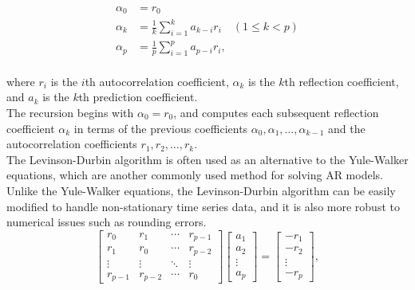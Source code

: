 \begin{equation*}
    \begin{aligned}
        \alpha_0 &= r_0 \\
        \alpha_k &= \frac{1}{k} \sum_{i=1}^{k} a_{k-i} r_i \quad (1 \leq k < p) \\
        \alpha_p &= \frac{1}{p} \sum_{i=1}^{p} a_{p-i} r_i,
    \end{aligned}
\end{equation*}
\\
where $r_i$ is the $i$th autocorrelation coefficient, $\alpha_k$ is the $k$th reflection coefficient, and $a_k$ is the $k$th
prediction coefficient.
\\
The recursion begins with $\alpha_0 = r_0$, and computes each subsequent reflection coefficient $\alpha_k$ in terms of the
previous coefficients $\alpha_0, \alpha_1, \ldots, \alpha_{k-1}$ and the autocorrelation coefficients $r_1, r_2, \ldots, r_k$.\\
The Levinson-Durbin algorithm is often used as an alternative to the Yule-Walker equations, which are another commonly
used method for solving AR models. Unlike the Yule-Walker equations, the Levinson-Durbin algorithm can be easily
modified to handle non-stationary time series data, and it is also more robust to numerical issues such as
rounding errors.\\
\begin{equation*}
    \begin{bmatrix}
        r_0     & r_1     & \cdots & r_{p-1} \\
        r_1     & r_0     & \cdots & r_{p-2} \\
        \vdots  & \vdots  & \ddots & \vdots  \\
        r_{p-1} & r_{p-2} & \cdots & r_0
    \end{bmatrix}
    \begin{bmatrix}
        a_1    \\
        a_2    \\
        \vdots \\
        a_p
    \end{bmatrix}
    =
    \begin{bmatrix}
        -r_1   \\
        -r_2   \\
        \vdots \\
        -r_p
    \end{bmatrix},
\end{equation*}

